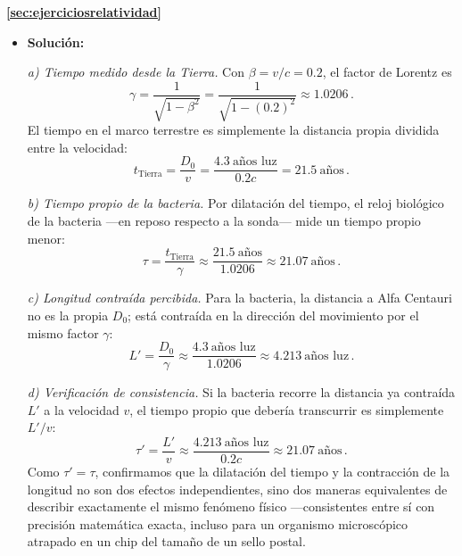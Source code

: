 \documentclass[11pt,a4paper]{book}
\begin{document}
\noindent
\textbf{\ref{sec:ejerciciosrelatividad}}
\begin{itemize}
    \item[Ejercicio \ref{item:starshot}:] 

    \textbf{Solución:}

\textit{a) Tiempo medido desde la Tierra.} Con $\beta = v/c = 0.2$, el factor de
Lorentz es
\begin{equation}
    \gamma = \frac{1}{\sqrt{1-\beta^2}} = \frac{1}{\sqrt{1-(0.2)^2}} \approx 1.0206\,.
\end{equation}
El tiempo en el marco terrestre es simplemente la distancia propia dividida entre
la velocidad:
\begin{equation}
    t_{\text{Tierra}} = \frac{D_0}{v} = \frac{4.3\ \text{años luz}}{0.2c} = 21.5\ \text{años}\,.
\end{equation}

\textit{b) Tiempo propio de la bacteria.} Por dilatación del tiempo, el reloj
biológico de la bacteria —en reposo respecto a la sonda— mide un tiempo propio
menor:
\begin{equation}
    \tau = \frac{t_{\text{Tierra}}}{\gamma} \approx \frac{21.5\ \text{años}}{1.0206}
    \approx 21.07\ \text{años}\,.
\end{equation}

\textit{c) Longitud contraída percibida.} Para la bacteria, la distancia a Alfa
Centauri no es la propia $D_0$; está contraída en la dirección del movimiento por
el mismo factor $\gamma$:
\begin{equation}
    L' = \frac{D_0}{\gamma} \approx \frac{4.3\ \text{años luz}}{1.0206}
    \approx 4.213\ \text{años luz}\,.
\end{equation}

\textit{d) Verificación de consistencia.} Si la bacteria recorre la distancia ya
contraída $L'$ a la velocidad $v$, el tiempo propio que debería transcurrir es
simplemente $L'/v$:
\begin{equation}
    \tau' = \frac{L'}{v} \approx \frac{4.213\ \text{años luz}}{0.2c} \approx 21.07\ \text{años}\,.
\end{equation}
Como $\tau' = \tau$, confirmamos que la dilatación del tiempo y la contracción de
la longitud no son dos efectos independientes, sino dos maneras equivalentes de
describir exactamente el mismo fenómeno físico —consistentes entre sí con
precisión matemática exacta, incluso para un organismo microscópico atrapado en
un chip del tamaño de un sello postal.



\end{itemize}
\end{document}

